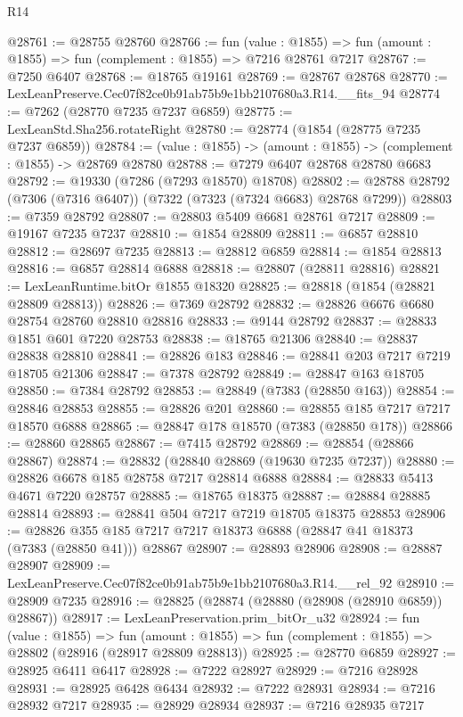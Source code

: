\begin{lexlean}{R14}
\begin{coremodule}
@28761 := @28755 @28760
@28766 := fun (value : @1855) =>
  fun (amount : @1855) => fun (complement : @1855) => @7216 @28761 @7217
@28767 := @7250 @6407
@28768 := @18765 @19161
@28769 := @28767 @28768
@28770 := LexLeanPreserve.Cec07f82ce0b91ab75b9e1bb2107680a3.R14.__fits_94
@28774 := @7262 (@28770 @7235 @7237 @6859)
@28775 := LexLeanStd.Sha256.rotateRight
@28780 := @28774 (@1854 (@28775 @7235 @7237 @6859))
@28784 := (value : @1855) -> (amount : @1855) -> (complement : @1855) -> @28769 @28780
@28788 := @7279 @6407 @28768 @28780 @6683
@28792 := @19330 (@7286 (@7293 @18570) @18708)
@28802 := @28788 @28792 (@7306 (@7316 @6407)) (@7322 (@7323 (@7324 @6683) @28768 @7299))
@28803 := @7359 @28792
@28807 := @28803 @5409 @6681 @28761 @7217
@28809 := @19167 @7235 @7237
@28810 := @1854 @28809
@28811 := @6857 @28810
@28812 := @28697 @7235
@28813 := @28812 @6859
@28814 := @1854 @28813
@28816 := @6857 @28814 @6888
@28818 := @28807 (@28811 @28816)
@28821 := LexLeanRuntime.bitOr @1855 @18320
@28825 := @28818 (@1854 (@28821 @28809 @28813))
@28826 := @7369 @28792
@28832 := @28826 @6676 @6680 @28754 @28760 @28810 @28816
@28833 := @9144 @28792
@28837 := @28833 @1851 @601 @7220 @28753
@28838 := @18765 @21306
@28840 := @28837 @28838 @28810
@28841 := @28826 @183
@28846 := @28841 @203 @7217 @7219 @18705 @21306
@28847 := @7378 @28792
@28849 := @28847 @163 @18705
@28850 := @7384 @28792
@28853 := @28849 (@7383 (@28850 @163))
@28854 := @28846 @28853
@28855 := @28826 @201
@28860 := @28855 @185 @7217 @7217 @18570 @6888
@28865 := @28847 @178 @18570 (@7383 (@28850 @178))
@28866 := @28860 @28865
@28867 := @7415 @28792
@28869 := @28854 (@28866 @28867)
@28874 := @28832 (@28840 @28869 (@19630 @7235 @7237))
@28880 := @28826 @6678 @185 @28758 @7217 @28814 @6888
@28884 := @28833 @5413 @4671 @7220 @28757
@28885 := @18765 @18375
@28887 := @28884 @28885 @28814
@28893 := @28841 @504 @7217 @7219 @18705 @18375 @28853
@28906 := @28826 @355 @185 @7217 @7217 @18373 @6888 (@28847 @41 @18373 (@7383 (@28850 @41))) @28867
@28907 := @28893 @28906
@28908 := @28887 @28907
@28909 := LexLeanPreserve.Cec07f82ce0b91ab75b9e1bb2107680a3.R14.__rel_92
@28910 := @28909 @7235
@28916 := @28825 (@28874 (@28880 (@28908 (@28910 @6859)) @28867))
@28917 := LexLeanPreservation.prim_bitOr_u32
@28924 := fun (value : @1855) =>
  fun (amount : @1855) => fun (complement : @1855) => @28802 (@28916 (@28917 @28809 @28813))
@28925 := @28770 @6859
@28927 := @28925 @6411 @6417
@28928 := @7222 @28927
@28929 := @7216 @28928
@28931 := @28925 @6428 @6434
@28932 := @7222 @28931
@28934 := @7216 @28932 @7217
@28935 := @28929 @28934
@28937 := @7216 @28935 @7217

\end{coremodule}
\end{lexlean}
